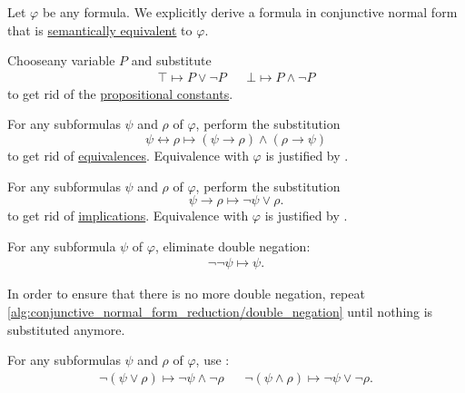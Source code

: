 \begin{algorithm}\label{alg:conjunctive_normal_form_reduction}
  Let \( \varphi \) be any formula. We explicitly derive a formula in conjunctive normal form that is \hyperref[def:propositional_interpretation/equivalence]{semantically equivalent} to \( \varphi \).

  \begin{AlgEnum}
     Choose\AOC any variable \( P \) and substitute
    \begin{align*}
      \top \mapsto P \vee \neg P && \bot \mapsto P \wedge \neg P
    \end{align*}
    to get rid of the \hyperref[def:propositional_alphabet/constants]{propositional constants}.

     For any subformulas \( \psi \) and \( \rho \) of \( \varphi \), perform the substitution
    \begin{equation*}
      \psi \leftrightarrow \rho \mapsto (\psi \rightarrow \rho) \wedge (\rho \rightarrow \psi)
    \end{equation*}
    to get rid of \hyperref[def:propositional_alphabet/connectives/equivalence]{equivalences}. Equivalence with \( \varphi \) is justified by .

     For any subformulas \( \psi \) and \( \rho \) of \( \varphi \), perform the substitution
    \begin{equation*}
      \psi \rightarrow \rho \mapsto \neg \psi \vee \rho.
    \end{equation*}
    to get rid of \hyperref[def:propositional_alphabet/connectives/implication]{implications}. Equivalence with \( \varphi \) is justified by .

     For any subformula \( \psi \) of \( \varphi \), eliminate double negation:
    \begin{align*}
      \neg \neg \psi \mapsto \psi.
    \end{align*}

    In order to ensure that there is no more double negation, repeat \ref{alg:conjunctive_normal_form_reduction/double_negation} until nothing is substituted anymore.

     For any subformulas \( \psi \) and \( \rho \) of \( \varphi \), use :
    \begin{align*}
      \neg(\psi \vee \rho) \mapsto \neg \psi \wedge \neg \rho
      &&
      \neg(\psi \wedge \rho) \mapsto \neg \psi \vee \neg \rho.
    \end{align*}


\end{AlgEnum}
\end{algorithm}
